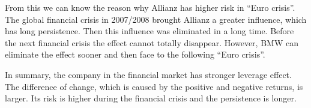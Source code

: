 From this we can know the reason why Allianz has higher risk in ``Euro crisis''. The global financial crisis in 2007/2008 brought Allianz a greater influence, which has long persistence. Then this influence was eliminated in a long time. Before the next financial crisis the effect cannot totally disappear. However, BMW can eliminate the effect sooner and then face to the following ``Euro crisis''. 

In summary, the company in the financial market has stronger leverage effect. The difference of change, which is caused by the positive and negative returns, is larger. Its risk is higher during the financial crisis and the persistence is longer.
